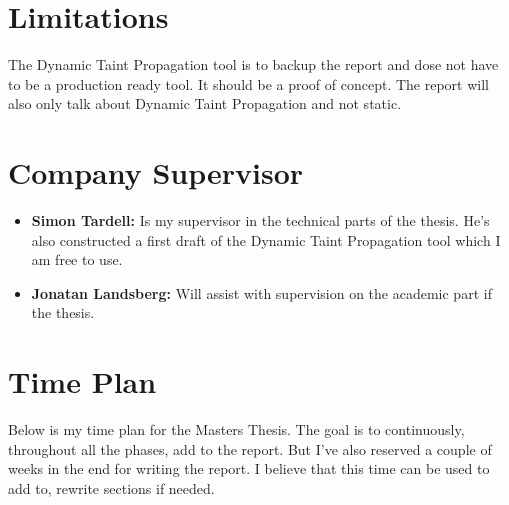 \documentclass{../kththesis}
\begin{document}
\section{Limitations}
The Dynamic Taint Propagation tool is to backup the report and dose not have to be a production ready tool. It should be a proof of concept. The report will also only talk about Dynamic Taint Propagation and not static. 


\section{Company Supervisor}
\begin{itemize}
	\item \textbf{Simon Tardell:} Is my supervisor in the technical parts of the thesis. He's also constructed a first draft of the Dynamic Taint Propagation tool which I am free to use.
	\item \textbf{Jonatan Landsberg:} Will assist with supervision on the academic part if the thesis.
\end{itemize}


\section{Time Plan}
Below is my time plan for the Masters Thesis. The goal is to continuously, throughout all the phases, add to the report. But I've also reserved a couple of weeks in the end for writing the report. I believe that this time can be used to add to, rewrite sections if needed.  \\ \\

\begin{ganttchart}[vgrid, hgrid, today=3]{1}{20}
	 \\
	\\
	 \\
	 \\
	 \\
	 \\
	 \\
\end{ganttchart}

\printbibliography[heading=bibintoc] %
\end{document}

